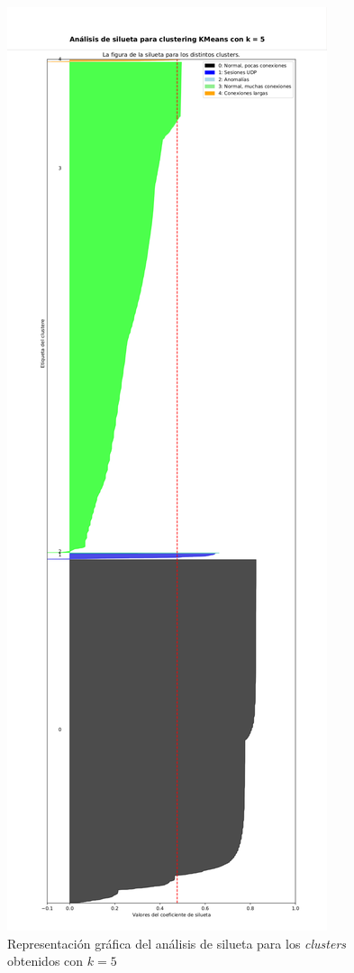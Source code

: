 \begin{figure}[h]
    \centering
    \includegraphics[height=\textheight]{contenido/fig/silhouette_cropped.pdf}
    \caption{Representación gráfica del análisis de silueta para los \emph{clusters} obtenidos con $k=5$}
    \label{fig:silhouette}
\end{figure}
